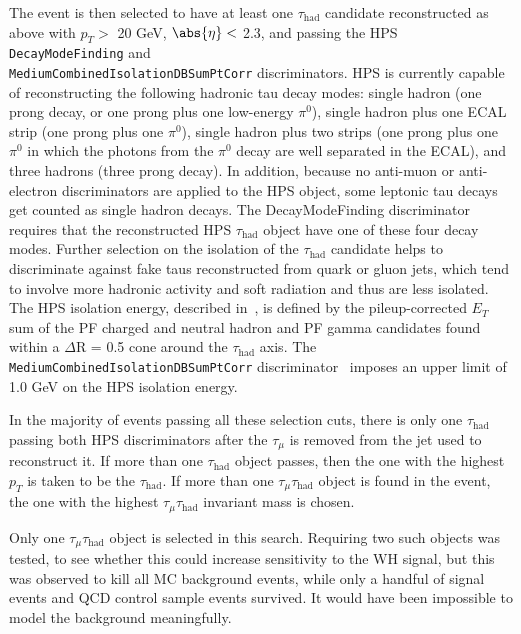 The event is then selected to have at least one $\tau_{\text{had}}$ candidate reconstructed as above with $p_T >$ 20 GeV, $\abs{\eta} <$ 2.3, and passing the HPS \texttt{DecayModeFinding} and \texttt{\\MediumCombinedIsolationDBSumPtCorr} discriminators. HPS is currently capable of reconstructing the following hadronic tau decay modes: single hadron (one prong decay, or one prong plus one low-energy $\pi^0$), single hadron plus one ECAL strip (one prong plus one $\pi^0$), single hadron plus two strips (one prong plus one $\pi^0$ in which the photons from the $\pi^0$ decay are well separated in the ECAL), and three hadrons (three prong decay). In addition, because no anti-muon or anti-electron discriminators are applied to the HPS object, some leptonic tau decays get counted as single hadron decays.  The DecayModeFinding discriminator requires that the reconstructed HPS $\tau_{\text{had}}$ object have one of these four decay modes. Further selection on the isolation of the $\tau_{\text{had}}$ candidate helps to discriminate against fake taus reconstructed from quark or gluon jets, which tend to involve more hadronic activity and soft radiation and thus are less isolated.  The HPS isolation energy, described in~\cite{CMS_AN_2010-082}, is defined by the pileup-corrected $E_T$ sum of the PF charged and neutral hadron and PF gamma candidates found within a $\Delta$R = 0.5 cone around the $\tau_{\text{had}}$ axis.  The \texttt{MediumCombinedIsolationDBSumPtCorr} discriminator~\cite{CMS:tauidtwiki} imposes an upper limit of 1.0 GeV on the HPS isolation energy.

In the majority of events passing all these selection cuts, there is only one $\tau_{\text{had}}$ passing both HPS discriminators after the $\tau_{\mu}$ is removed from the jet used to reconstruct it. If more than one $\tau_{\text{had}}$ object passes, then the one with the highest $p_T$ is taken to be the $\tau_{\text{had}}$. If more than one $\tau_{\mu}\tau_{\text{had}}$ object is found in the event, the one with the highest $\tau_{\mu}\tau_{\text{had}}$ invariant mass is chosen.

Only one $\tau_{\mu}\tau_{\text{had}}$ object is selected in this search. Requiring two such objects was tested, to see whether this could increase sensitivity to the WH signal, but this was observed to kill all MC background events, while only a handful of signal events and QCD control sample events survived.  It would have been impossible to model the background meaningfully.

